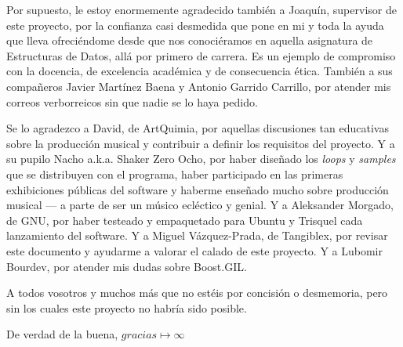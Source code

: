 Por supuesto, le estoy enormemente agradecido también a Joaquín,
supervisor de este proyecto, por la confianza casi desmedida que pone
en mi y toda la ayuda que lleva ofreciéndome desde que nos
conociéramos en aquella asignatura de Estructuras de Datos, allá por
primero de carrera. Es un ejemplo de compromiso con la docencia, de
excelencia académica y de consecuencia ética. También a sus
compañeros Javier Martínez Baena y Antonio Garrido Carrillo, por
atender mis correos verborreicos sin que nadie se lo haya pedido.

Se lo agradezco a David, de ArtQuimia, por aquellas discusiones tan
educativas sobre la producción musical y contribuir a definir los
requisitos del proyecto. Y a su pupilo Nacho a.k.a. Shaker Zero Ocho,
por haber diseñado los \emph{loops} y \emph{samples} que se
distribuyen con el programa, haber participado en las primeras
exhibiciones públicas del software y haberme enseñado mucho sobre
producción musical --- a parte de ser un músico ecléctico y genial. Y
a Aleksander Morgado, de GNU, por haber testeado y empaquetado para
Ubuntu y Trisquel cada lanzamiento del software. Y a Miguel
Vázquez-Prada, de Tangiblex, por revisar este documento y ayudarme a
valorar el calado de este proyecto. Y a Lubomir Bourdev, por atender
mis dudas sobre Boost.GIL.

A todos vosotros y muchos más que no estéis por concisión o
desmemoria, pero sin los cuales este proyecto no habría sido posible.

\vspace{1cm}
De verdad de la buena, $gracias \mapsto \infty$



